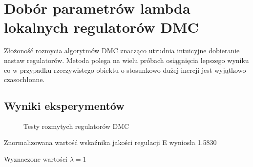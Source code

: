 \section{Dobór parametrów lambda lokalnych regulatorów DMC}
\label{lab:zad6}

Złożoność rozmycia algorytmów DMC znacząco utrudnia intuicyjne dobieranie nastaw regulatorów.
Metoda polega na wielu próbach osiągnięcia lepszego wyniku co w 
przypadku rzeczywistego obiektu o stosunkowo dużej inercji jest wyjątkowo czasochłonne.


\subsection{Wyniki eksperymentów}
\label{lab:zad6:eksperymenty}

\begin{figure}[H] 
   \centering
   
   \caption{Testy rozmytych regulatorów DMC}
   \label{lab:zad6:eksperymenty:figure}
\end{figure}

Znormalizowana wartość wskaźnika jakości regulacji E wyniosła \num{1.5830}

Wyznaczone wartości $\lambda = 1$
\newpage
